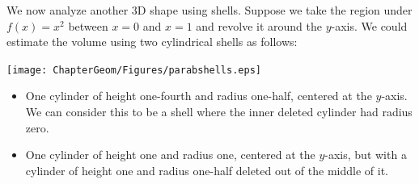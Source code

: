 We now analyze another 3D shape using shells.  Suppose we take the region under $f(x)=x^2$ between $x=0$ and $x=1$ and revolve it around the $y$-axis.  We could estimate the volume using two cylindrical shells as follows:

	\begin{center}
		\texttt{[image: ChapterGeom/Figures/parabshells.eps]}
	\end{center} 

\begin{itemize}
\item One cylinder of height one-fourth and radius one-half, centered at the $y$-axis.  We can consider this to be a shell where the inner deleted cylinder had radius zero.

\item One cylinder of height one and radius one, centered at the $y$-axis, but with a cylinder of height one and radius one-half deleted out of the middle of it.   

\end{itemize}


